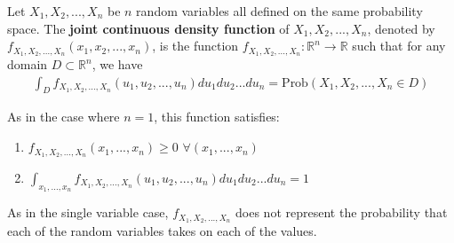 \documentclass{article}
\begin{document}
Let $X_1, X_2, ..., X_n$ be $n$ random variables all defined on the same probability space. The \textbf{joint continuous density function} of $X_1, X_2, ..., X_n$, denoted by $f_{X_1, X_2, ..., X_n}(x_1,x_2,...,x_n)$, is the function
$f_{X_1, X_2, ..., X_n}: \mathbb{R}^n \to \mathbb{R}$ such that for any domain $D\subset \mathbb{R}^n$, we have
\begin{align*}
\int_D  {  f_{X_1,X_2,..., X_n}(u_1,u_2,...,u_n) du_1 du_2 ... du_n  } = \text{Prob}({X_1,X_2,...,X_n}\in D)
\end{align*}
\par
As in the case where $n=1$, this function satisfies:\\
\par
\begin{enumerate}
\item $f_{X_1, X_2, ..., X_n}(x_1,...,x_n) \geq  0$    $\forall (x_1,...,x_n)$
\item $\int_{x_1, ... ,x_n}^{} {  f_{X_1, X_2, ..., X_n}(u_1,u_2,...,u_n) du_1 du_2 ... du_n }= 1$
\end{enumerate}
\par
As in the single variable case, $f_{X_1, X_2, ..., X_n}$ does not represent the probability that each of the random variables takes on each of the values.
\end{document}
